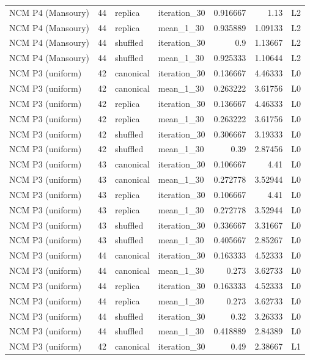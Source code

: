 \begin{table}[htbp!]
\begin{tabular}{lrllrrl}
NCM P4 (Mansoury) & 44 & replica & iteration\_30 & 0.916667 & 1.13 & L2 \\
NCM P4 (Mansoury) & 44 & replica & mean\_1\_30 & 0.935889 & 1.09133 & L2 \\
NCM P4 (Mansoury) & 44 & shuffled & iteration\_30 & 0.9 & 1.13667 & L2 \\
NCM P4 (Mansoury) & 44 & shuffled & mean\_1\_30 & 0.925333 & 1.10644 & L2 \\
NCM P3 (uniform) & 42 & canonical & iteration\_30 & 0.136667 & 4.46333 & L0 \\
NCM P3 (uniform) & 42 & canonical & mean\_1\_30 & 0.263222 & 3.61756 & L0 \\
NCM P3 (uniform) & 42 & replica & iteration\_30 & 0.136667 & 4.46333 & L0 \\
NCM P3 (uniform) & 42 & replica & mean\_1\_30 & 0.263222 & 3.61756 & L0 \\
NCM P3 (uniform) & 42 & shuffled & iteration\_30 & 0.306667 & 3.19333 & L0 \\
NCM P3 (uniform) & 42 & shuffled & mean\_1\_30 & 0.39 & 2.87456 & L0 \\
NCM P3 (uniform) & 43 & canonical & iteration\_30 & 0.106667 & 4.41 & L0 \\
NCM P3 (uniform) & 43 & canonical & mean\_1\_30 & 0.272778 & 3.52944 & L0 \\
NCM P3 (uniform) & 43 & replica & iteration\_30 & 0.106667 & 4.41 & L0 \\
NCM P3 (uniform) & 43 & replica & mean\_1\_30 & 0.272778 & 3.52944 & L0 \\
NCM P3 (uniform) & 43 & shuffled & iteration\_30 & 0.336667 & 3.31667 & L0 \\
NCM P3 (uniform) & 43 & shuffled & mean\_1\_30 & 0.405667 & 2.85267 & L0 \\
NCM P3 (uniform) & 44 & canonical & iteration\_30 & 0.163333 & 4.52333 & L0 \\
NCM P3 (uniform) & 44 & canonical & mean\_1\_30 & 0.273 & 3.62733 & L0 \\
NCM P3 (uniform) & 44 & replica & iteration\_30 & 0.163333 & 4.52333 & L0 \\
NCM P3 (uniform) & 44 & replica & mean\_1\_30 & 0.273 & 3.62733 & L0 \\
NCM P3 (uniform) & 44 & shuffled & iteration\_30 & 0.32 & 3.26333 & L0 \\
NCM P3 (uniform) & 44 & shuffled & mean\_1\_30 & 0.418889 & 2.84389 & L0 \\
NCM P3 (uniform) & 42 & canonical & iteration\_30 & 0.49 & 2.38667 & L1 \\

\end{tabular}
\end{table}
